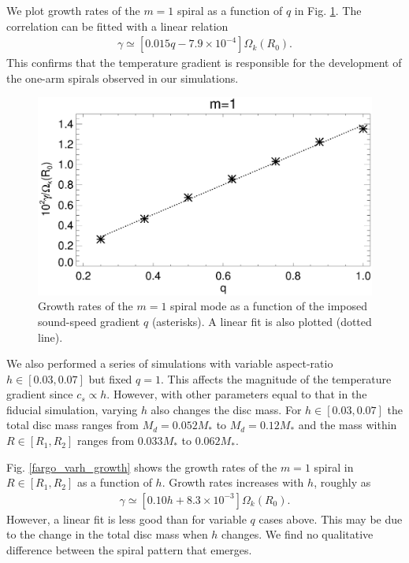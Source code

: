 We plot growth rates of the $m=1$ spiral as a function of $q$ in 
Fig. \ref{fargo_varq_growth}. The correlation can be fitted with a
linear relation
\begin{align*}
  \gamma \simeq \left[0.015 q - 7.9\times10^{-4}\right] \Omega_k(R_0). 
\end{align*}
This confirms that the temperature gradient is responsible for the
development of the one-arm spirals observed in our simulations. 
\begin{figure}
  \includegraphics[width=\linewidth]{figures/m1_analysis_plot_ratemax_fargo_varq.ps}    
  \caption{Growth rates of the $m=1$ spiral mode as a function of the
    imposed sound-speed gradient $q$ (asterisks). A linear fit is also
    plotted (dotted line). 
    \label{fargo_varq_growth}} 
\end{figure}

We also performed a series of simulations with variable aspect-ratio
$h\in[0.03,0.07]$ but fixed $q=1$. This affects the magnitude of the temperature
gradient since $c_s \propto h$. However, with other parameters equal
to that in the fiducial simulation,  varying $h$ also changes the disc
mass. For $h\in[0.03,0.07]$ the total disc mass ranges from
$M_d=0.052M_*$ to $M_d=0.12M_*$ and the 
mass within $R\in[R_1,R_2]$  ranges from $0.033M_*$ to $0.062M_*$. 

Fig. \ref{fargo_varh_growth} shows the growth rates of the $m=1$
spiral in $R\in[R_1,R_2]$ as a function of $h$. Growth rates increases
with $h$, roughly as  
\begin{align}
  \gamma \simeq \left[0.10h + 8.3\times10^{-3}\right]\Omega_k(R_0).  
\end{align}
However, a linear fit is less good than for variable $q$ cases above. This
may be due to the change in the total disc mass when $h$ changes. We
find no qualitative difference between the spiral pattern that
emerges. 

